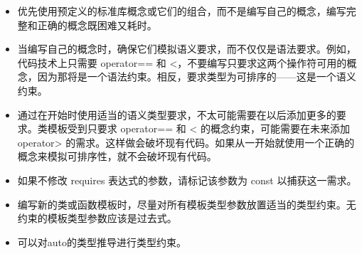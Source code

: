 \begin{itemize}
\item
优先使用预定义的标准库概念或它们的组合，而不是编写自己的概念，编写完整和正确的概念既困难又耗时。

\item
当编写自己的概念时，确保它们模拟语义要求，而不仅仅是语法要求。例如，代码技术上只需要 operator== 和 <，不要编写只要求这两个操作符可用的概念，因为那将是一个语法约束。相反，要求类型为可排序的——这是一个语义约束。

\item
通过在开始时使用适当的语义类型要求，不太可能需要在以后添加更多的要求。类模板受到只要求 operator== 和 < 的概念约束，可能需要在未来添加 operator> 的需求。这样做会破坏现有代码。如果从一开始就使用一个正确的概念来模拟可排序性，就不会破坏现有代码。

\item
如果不修改 requires 表达式的参数，请标记该参数为 const 以捕获这一需求。

\item
编写新的类或函数模板时，尽量对所有模板类型参数放置适当的类型约束。无约束的模板类型参数应该是过去式。

\item
可以对auto的类型推导进行类型约束。
\end{itemize}

















